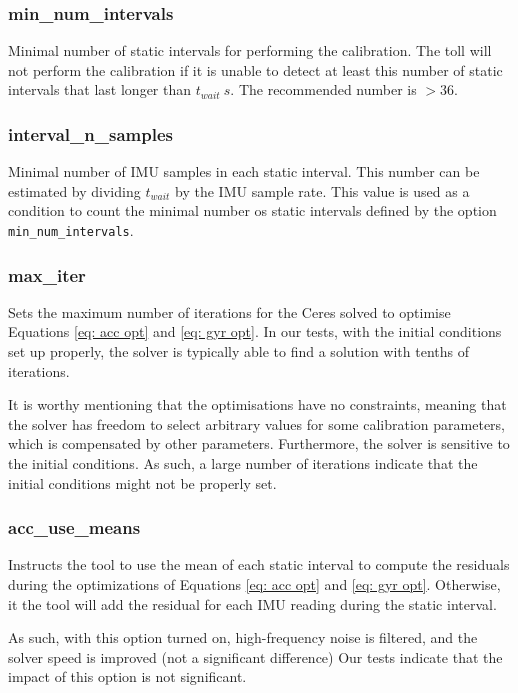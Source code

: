 \subsubsection*{min\_num\_intervals}
Minimal number of static intervals for performing the calibration. The toll will not perform the calibration if it is unable to detect at least this number of static intervals that last longer than $t_{wait}~s$.
%
The recommended number is $>36$.

\subsubsection*{interval\_n\_samples}
Minimal number of IMU samples in each static interval. This number can be estimated by dividing $t_{wait}$ by the IMU sample rate.
%
This value is used as a condition to count the minimal number os static intervals defined by the option \texttt{min\_num\_intervals}.

\subsubsection*{max\_iter}
Sets the maximum number of iterations for the Ceres solved to optimise Equations \ref{eq: acc opt} and \ref{eq: gyr opt}.
%
In our tests, with the initial conditions set up properly, the solver is typically able to find a solution with tenths of iterations.

\begin{important}
	It is worthy mentioning that the optimisations have no constraints, meaning that the solver has freedom to select arbitrary values for some calibration parameters, which is compensated by other parameters.
	Furthermore, the solver is sensitive to the initial conditions.
	As such, a large number of iterations indicate that the initial conditions might not be properly set.
\end{important}

\subsubsection*{acc\_use\_means}
Instructs the tool to use the mean of each static interval to compute the residuals during the optimizations of Equations \ref{eq: acc opt} and \ref{eq: gyr opt}.
%
Otherwise, it the tool will add the residual for each IMU reading during the static interval.

As such, with this option turned on, high-frequency noise is filtered, and the solver speed is improved (not a significant difference)
%
Our tests indicate that the impact of this option is not significant.

